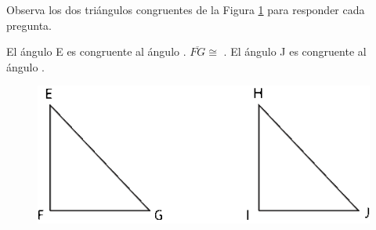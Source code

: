 Observa los dos triángulos congruentes de la Figura \ref{fig:congruencia03}  para responder cada pregunta.

\begin{minipage}{0.5\textwidth}
    \begin{parts}
        El ángulo E es congruente al ángulo \fillin[H][1cm].
        $\overline{FG} \cong$  \fillin[$\overline{IJ}$][1cm].
        El ángulo J es congruente al ángulo \fillin[G][1cm].
    \end{parts}
\end{minipage}%
\begin{minipage}{0.5\textwidth}
    \begin{figure}[H]
        \centering
        \includegraphics[width=\linewidth]{../images/congruencia03}
        \caption{}
        \label{fig:congruencia03}
    \end{figure}
\end{minipage}